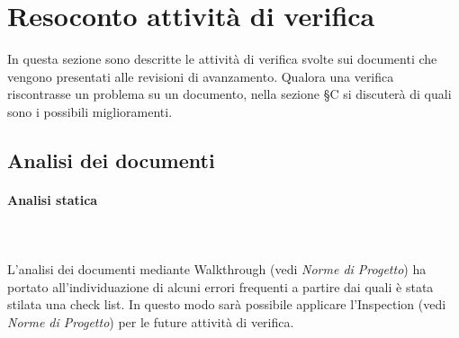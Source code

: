 \section{Resoconto attività di verifica}
In questa sezione sono descritte le attività di verifica svolte sui documenti che vengono presentati alle revisioni di avanzamento. Qualora una verifica riscontrasse un problema su un documento, nella sezione \S C si discuterà di quali sono i possibili miglioramenti.

\subsection{Analisi dei documenti}
\paragraph*{Analisi statica} \mbox{} \\ \mbox{} \\
L’analisi dei documenti mediante Walkthrough (vedi \textit{Norme di Progetto}) ha portato all’individuazione di alcuni errori frequenti a partire dai quali è stata stilata una check list. In questo modo sarà possibile applicare l’Inspection (vedi \textit{Norme di Progetto}) per le future attività di verifica.

